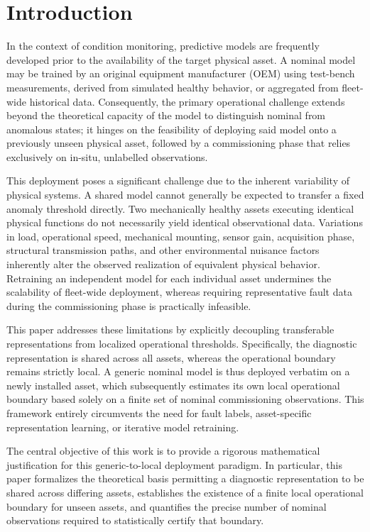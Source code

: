 \documentclass[a4paper]{cas-sc}
\begin{document}
\section{Introduction}
\label{sec:introduction}

In the context of condition monitoring, predictive models are frequently developed prior to the availability of the target physical asset. A nominal model may be trained by an original equipment manufacturer (OEM) using test-bench measurements, derived from simulated healthy behavior, or aggregated from fleet-wide historical data. Consequently, the primary operational challenge extends beyond the theoretical capacity of the model to distinguish nominal from anomalous states; it hinges on the feasibility of deploying said model onto a previously unseen physical asset, followed by a commissioning phase that relies exclusively on in-situ, unlabelled observations.

This deployment poses a significant challenge due to the inherent variability of physical systems. A shared model cannot generally be expected to transfer a fixed anomaly threshold directly. Two mechanically healthy assets executing identical physical functions do not necessarily yield identical observational data. Variations in load, operational speed, mechanical mounting, sensor gain, acquisition phase, structural transmission paths, and other environmental nuisance factors inherently alter the observed realization of equivalent physical behavior. Retraining an independent model for each individual asset undermines the scalability of fleet-wide deployment, whereas requiring representative fault data during the commissioning phase is practically infeasible.

This paper addresses these limitations by explicitly decoupling transferable representations from localized operational thresholds. Specifically, the diagnostic representation is shared across all assets, whereas the operational boundary remains strictly local. A generic nominal model is thus deployed verbatim on a newly installed asset, which subsequently estimates its own local operational boundary based solely on a finite set of nominal commissioning observations. This framework entirely circumvents the need for fault labels, asset-specific representation learning, or iterative model retraining.

The central objective of this work is to provide a rigorous mathematical justification for this generic-to-local deployment paradigm. In particular, this paper formalizes the theoretical basis permitting a diagnostic representation to be shared across differing assets, establishes the existence of a finite local operational boundary for unseen assets, and quantifies the precise number of nominal observations required to statistically certify that boundary.
\end{document}
